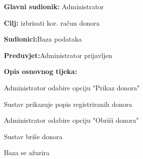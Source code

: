 \noindent {}
\begin{packed_item}
	
	\item \textbf{Glavni sudionik: }{Administrator}
	\item  \textbf{Cilj:} {izbrisati kor. račun donora}
	\item  \textbf{Sudionici:}{Baza podataka}
	\item  \textbf{Preduvjet:}{Administrator prijavljen}
	\item  \textbf{Opis osnovnog tijeka:}
	
	\item[] \begin{packed_enum}
		
		\item {Administrator odabire opciju "Prikaz donora"}
		\item {Sustav prikazuje popis registriranih donora} 
		\item {Administrator odabire opciju "Obriši donora"}
		\item {Sustav briše donora}
		\item {Baza se ažurira}
	\end{packed_enum}
	
\end{packed_item}

